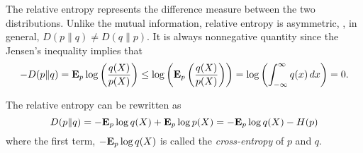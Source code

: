 The relative entropy represents the difference measure between the two distributions.
Unlike the mutual information, relative entropy is asymmetric, \ie,
in general, $D(p\|q) \neq D(q\|p)$.
It is always nonnegative quantity since the Jensen's inequality implies that
\begin{equation}
-D(p\|q) = \mathbf{E}_p \log\left(\frac{q(X)}{p(X)}\right)
\leq \log\left(\mathbf{E}_p \left(\frac{q(X)}{p(X)}\right)\right)
= \log\left(\int_{-\infty}^\infty q(x)\, dx \right) = 0.
\end{equation}

The relative entropy can be rewritten as
\begin{equation}
D(p\|q) = -\mathbf{E}_p \log q(X) + \mathbf{E}_p \log p(X)
= -\mathbf{E}_p \log q(X) - H(p)
\end{equation}
where the first term, $-\mathbf{E}_p \log q(X)$ is called the \emph{cross-entropy} of $p$ and $q$.

